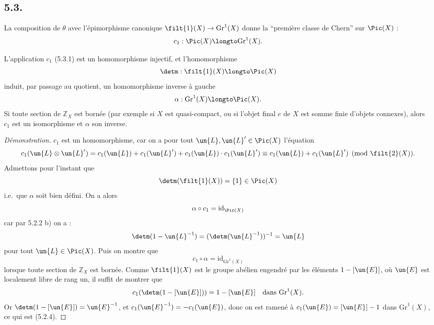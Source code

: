 \subsection*{5.3.}

La composition de $\theta$ avec l'\'epimorphisme canonique $\filt{1}(X) \to \mathrm{Gr}^{1}(X)$ donne la ``premi\`ere classe de Chern'' sur $\Pic(X)$ :
\begin{equation}\label{eq:5.3.1}
c_{1} : \Pic(X) \longto \mathrm{Gr}^{1}(X).
\end{equation}

\begin{theoreme}[5.3.2]
L'application $c_{1}$ (5.3.1) est un homomorphisme injectif, et l'homomorphisme
\[
\detm : \filt{1}(X) \longto \Pic(X)
\]
induit, par passage au quotient, un homomorphisme inverse \`a gauche
\[
\alpha : \mathrm{Gr}^{1}(X) \longto \Pic(X).
\]
Si toute section de $\mathbb{Z}_{X}$ est born\'ee (par exemple si $X$ est quasi-compact, ou si l'objet final $e$ de $X$ est somme finie d'objets connexes), alors $c_{1}$ est un isomorphisme et $\alpha$ son inverse.
\end{theoreme}

\begin{proof}[D\'emonstration]
$c_{1}$ est un homomorphisme, car on a pour tout $\un{L}, \un{L}' \in \Pic(X)$ l'\'equation
\[
c_{1}(\un{L} \otimes \un{L}') = c_{1}(\un{L}) + c_{1}(\un{L}') + c_{1}(\un{L}) \cdot c_{1}(\un{L}') \equiv c_{1}(\un{L}) + c_{1}(\un{L}') \pmod{\filt{2}(X)}.
\]
Admettons pour l'instant que
\[
\detm(\filt{1}(X)) = \{1\} \in \Pic(X)
\]
i.e.\ que $\alpha$ soit bien d\'efini. On a alors
\[
\alpha \circ c_{1} = \mathrm{id}_{\Pic(X)}
\]
car par 5.2.2 b) on a :
\[
\detm(1 - \un{L}^{-1}) = (\detm(\un{L}^{-1}))^{-1} = \un{L}
\]
pour tout $\un{L} \in \Pic(X)$. Puis on montre que
\[
c_{1} \circ \alpha = \mathrm{id}_{\mathrm{Gr}^{1}(X)}
\]
lorsque toute section de $\mathbb{Z}_{X}$ est born\'ee. Comme $\filt{1}(X)$ est le groupe ab\'elien engendr\'e par les \'el\'ements $1 - [\un{E}]$, o\`u $\un{E}$ est localement libre de rang un, il suffit de montrer que
\[
c_{1}(\detm(1 - [\un{E}])) = 1 - [\un{E}] \quad \text{dans } \mathrm{Gr}^{1}(X).
\]
Or $\detm(1 - [\un{E}]) = \un{E}^{-1}$, et $c_{1}(\un{E}^{-1}) = -c_{1}(\un{E})$, donc on est ramen\'e \`a $c_{1}(\un{E}) = [\un{E}] - 1$ dans $\mathrm{Gr}^{1}(X)$, ce qui est (5.2.4).
\end{proof}


